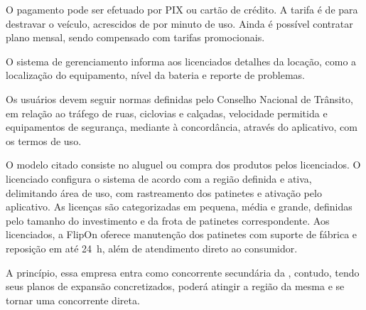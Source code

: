 O pagamento pode ser efetuado por PIX ou cartão de crédito. A tarifa é de  para destravar o veículo, acrescidos de  por minuto de uso. Ainda é possível contratar plano mensal, sendo compensado com tarifas promocionais.

O sistema de gerenciamento informa aos licenciados detalhes da locação, como a localização do equipamento, nível da bateria e reporte de problemas.

Os usuários devem seguir normas definidas pelo Conselho Nacional de Trânsito, em relação ao tráfego de ruas, ciclovias e calçadas, velocidade permitida e equipamentos de segurança, mediante à concordância, através do aplicativo, com os termos de uso.

O modelo citado consiste no aluguel ou compra dos produtos pelos licenciados. O licenciado configura o sistema de acordo com a região definida e ativa, delimitando área de uso, com rastreamento dos patinetes e ativação pelo aplicativo. As licenças são categorizadas em pequena, média e grande, definidas pelo tamanho do investimento e da frota de patinetes correspondente. Aos licenciados, a FlipOn oferece manutenção dos patinetes com suporte de fábrica e reposição em até \SI{24}{\hour}, além de atendimento direto ao consumidor.

A princípio, essa empresa entra como concorrente secundária da \nomeproduto, contudo, tendo seus planos de expansão concretizados, poderá atingir a região da mesma e se tornar uma concorrente direta.


